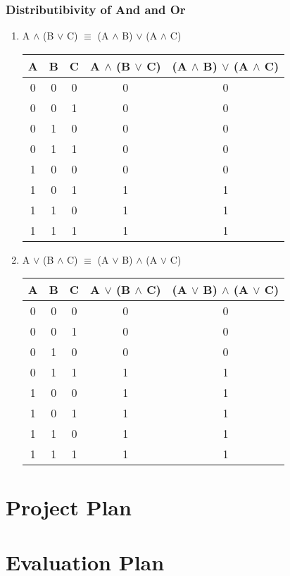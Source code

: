 \documentclass[11pt]{article}
\begin{document}
\subsubsection{Distributibivity of And and Or}
\begin{enumerate}

  \item A $\land$ (B $\lor$ C) $\equiv$ (A $\land$ B) $\lor$ (A $\land$ C)

\begin{center}
  \begin{tabular}{| c | c | c | c | c |}
    \hline
    A & B & C & A $\land$ (B $\lor$ C) & (A $\land$ B) $\lor$ (A $\land$ C) \\ \hline
    0 & 0 & 0 & 0 & 0 \\
    0 & 0 & 1 & 0 & 0 \\
    0 & 1 & 0 & 0 & 0 \\
    0 & 1 & 1 & 0 & 0 \\
    1 & 0 & 0 & 0 & 0 \\
    1 & 0 & 1 & 1 & 1 \\
    1 & 1 & 0 & 1 & 1 \\
    1 & 1 & 1 & 1 & 1 \\ \hline
  \end{tabular}
\end{center}

  \item A $\lor$ (B $\land$ C) $\equiv$ (A $\lor$ B) $\land$ (A $\lor$ C)

\begin{center}
  \begin{tabular}{| c | c | c | c | c |}
    \hline
    A & B & C & A $\lor$ (B $\land$ C) & (A $\lor$ B) $\land$ (A $\lor$ C) \\ \hline
    0 & 0 & 0 & 0 & 0 \\
    0 & 0 & 1 & 0 & 0 \\
    0 & 1 & 0 & 0 & 0 \\
    0 & 1 & 1 & 1 & 1 \\
    1 & 0 & 0 & 1 & 1 \\
    1 & 0 & 1 & 1 & 1 \\
    1 & 1 & 0 & 1 & 1 \\
    1 & 1 & 1 & 1 & 1 \\ \hline
  \end{tabular}
\end{center}


\end{enumerate}

\newpage

\section{Project Plan}

\newpage

\section{Evaluation Plan}

\newpage
\end{document}
